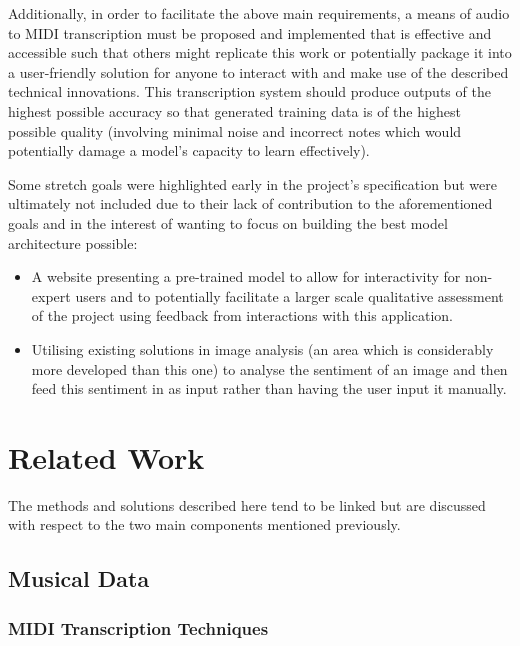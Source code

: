 \documentclass[12pt,]{article}
\providecommand{\tightlist}{%
  \setlength{\itemsep}{0pt}\setlength{\parskip}{0pt}}
\begin{document}
Additionally, in order to facilitate the above main requirements, a
means of audio to MIDI transcription must be proposed and implemented
that is effective and accessible such that others might replicate this
work or potentially package it into a user-friendly solution for anyone
to interact with and make use of the described technical innovations.
This transcription system should produce outputs of the highest possible
accuracy so that generated training data is of the highest possible
quality (involving minimal noise and incorrect notes which would
potentially damage a model's capacity to learn effectively).

Some stretch goals were highlighted early in the project's specification
but were ultimately not included due to their lack of contribution to
the aforementioned goals and in the interest of wanting to focus on
building the best model architecture possible:

\begin{itemize}
\tightlist
\item
  A website presenting a pre-trained model to allow for interactivity
  for non-expert users and to potentially facilitate a larger scale
  qualitative assessment of the project using feedback from interactions
  with this application.
\item
  Utilising existing solutions in image analysis (an area which is
  considerably more developed than this one) to analyse the sentiment of
  an image and then feed this sentiment in as input rather than having
  the user input it manually.
\end{itemize}

\hypertarget{related-work}{%
\section{Related Work}\label{related-work}}

The methods and solutions described here tend to be linked but are
discussed with respect to the two main components mentioned previously.

\hypertarget{musical-data}{%
\subsection{Musical Data}\label{musical-data}}

\hypertarget{midi-transcription-techniques}{%
\subsubsection{MIDI Transcription
Techniques}\label{midi-transcription-techniques}}
\end{document}

